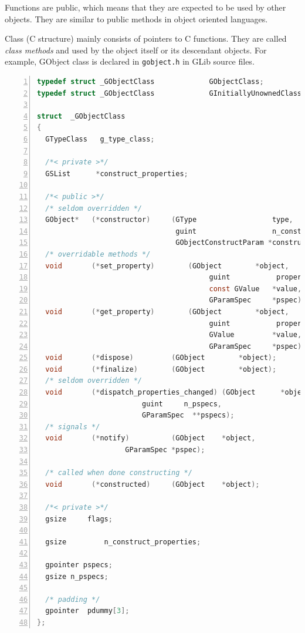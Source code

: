 Functions are public, which means that they are expected to be used by
other objects. They are similar to public methods in object oriented
languages.

Class (C structure) mainly consists of pointers to C functions. They are
called \emph{class methods} and used by the object itself or its
descendant objects. For example, GObject class is declared in
\passthrough{\lstinline!gobject.h!} in GLib source files.

\begin{lstlisting}[language=C, numbers=left]
typedef struct _GObjectClass             GObjectClass;
typedef struct _GObjectClass             GInitiallyUnownedClass;

struct  _GObjectClass
{
  GTypeClass   g_type_class;

  /*< private >*/
  GSList      *construct_properties;

  /*< public >*/
  /* seldom overridden */
  GObject*   (*constructor)     (GType                  type,
                                 guint                  n_construct_properties,
                                 GObjectConstructParam *construct_properties);
  /* overridable methods */
  void       (*set_property)        (GObject        *object,
                                         guint           property_id,
                                         const GValue   *value,
                                         GParamSpec     *pspec);
  void       (*get_property)        (GObject        *object,
                                         guint           property_id,
                                         GValue         *value,
                                         GParamSpec     *pspec);
  void       (*dispose)         (GObject        *object);
  void       (*finalize)        (GObject        *object);
  /* seldom overridden */
  void       (*dispatch_properties_changed) (GObject      *object,
                         guint     n_pspecs,
                         GParamSpec  **pspecs);
  /* signals */
  void       (*notify)          (GObject    *object,
                     GParamSpec *pspec);

  /* called when done constructing */
  void       (*constructed)     (GObject    *object);

  /*< private >*/
  gsize     flags;

  gsize         n_construct_properties;

  gpointer pspecs;
  gsize n_pspecs;

  /* padding */
  gpointer  pdummy[3];
};
\end{lstlisting}

